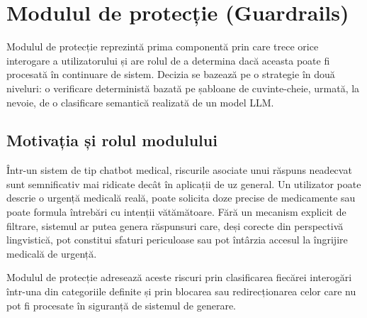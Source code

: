 \documentclass[12pt, a4paper, oneside, romanian]{teza-upb}
\begin{document}
\section{Modulul de protecție (Guardrails)}

Modulul de protecție reprezintă prima componentă prin care trece orice interogare a utilizatorului și are rolul de a determina dacă aceasta poate fi procesată în continuare de sistem. Decizia se bazează pe o strategie în două niveluri: o verificare deterministă bazată pe șabloane de cuvinte-cheie, urmată, la nevoie, de o clasificare semantică realizată de un model LLM.

\subsection{Motivația și rolul modulului}

Într-un sistem de tip chatbot medical, riscurile asociate unui răspuns neadecvat sunt semnificativ mai ridicate decât în aplicații de uz general. Un utilizator poate descrie o urgență medicală reală, poate solicita doze precise de medicamente sau poate formula întrebări cu intenții vătămătoare. Fără un mecanism explicit de filtrare, sistemul ar putea genera răspunsuri care, deși corecte din perspectivă lingvistică, pot constitui sfaturi periculoase sau pot întârzia accesul la îngrijire medicală de urgență.

Modulul de protecție adresează aceste riscuri prin clasificarea fiecărei interogări într-una din categoriile definite și prin blocarea sau redirecționarea celor care nu pot fi procesate în siguranță de sistemul de generare.
\end{document}
